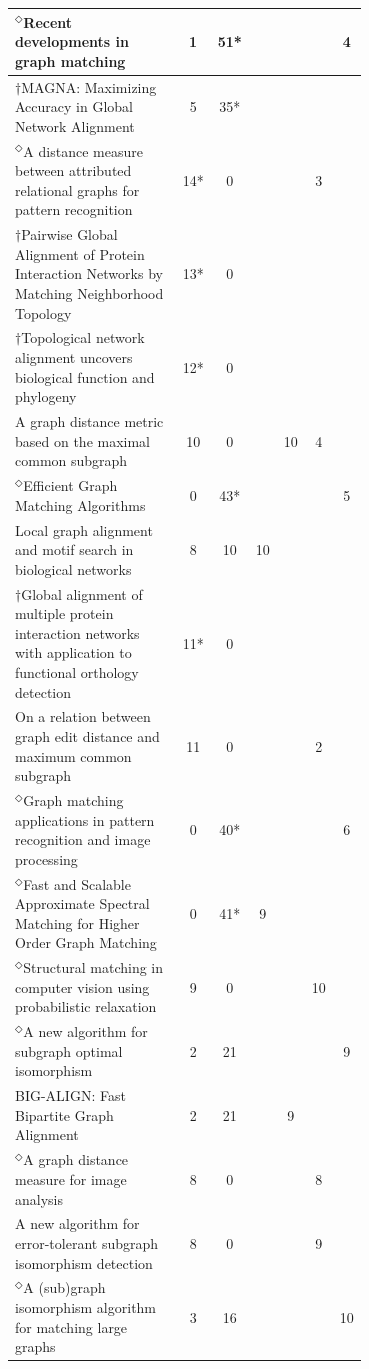 \documentclass[12pt]{thesis}
\theoremstyle{plain}
\theoremstyle{definition}
\theoremstyle{remark}
\begin{document}
\begin{table}[H]
{\begin{tabular}{|L{0.7\linewidth}|c|c|c|c|c|c|}
$^\Diamond$Recent developments in graph matching  \cite{Bunke_2000} & 1 & 51* &  &  &  & 4 \\ \hline
$\dagger$MAGNA: Maximizing Accuracy in Global Network Alignment  \cite{Saraph_2014} & 5 & 35* &  &  &  &  \\ \hline
$^\Diamond$A distance measure between attributed relational graphs for pattern recognition  \cite{Sanfeliu_1983} & 14* & 0 &  &  & 3 &  \\ \hline
$\dagger$Pairwise Global Alignment of Protein Interaction Networks by Matching Neighborhood Topology  \cite{Singh_2007} & 13* & 0 &  &  &  &  \\ \hline
$\dagger$Topological network alignment uncovers biological function and phylogeny  \cite{Bunke_1998} & 12* & 0 &  &  &  &  \\ \hline
A graph distance metric based on the maximal common subgraph  \cite{Kuchaiev_2010} & 10 & 0 &  & 10 & 4 &  \\ \hline
$^\Diamond$Efficient Graph Matching Algorithms  \cite{Messmer_1995} & 0 & 43* &  &  &  & 5 \\ \hline
Local graph alignment and motif search in biological networks  \cite{Berg_2004} & 8 & 10 & 10 &  &  &  \\ \hline
$\dagger$Global alignment of multiple protein interaction networks with application to functional orthology detection  \cite{Singh_2008} & 11* & 0 &  &  &  &  \\ \hline
On a relation between graph edit distance and maximum common subgraph  \cite{Bunke_1997} & 11 & 0 &  &  & 2 &  \\ \hline
$^\Diamond$Graph matching applications in pattern recognition and image processing  \cite{Conte_2003} & 0 & 40* &  &  &  & 6 \\ \hline
$^\Diamond$Fast and Scalable Approximate Spectral Matching for Higher Order Graph Matching  \cite{Park_2014} & 0 & 41* & 9 &  &  &  \\ \hline
$^\Diamond$Structural matching in computer vision using probabilistic relaxation  \cite{Christmas_1995} & 9 & 0 &  &  & 10 &  \\ \hline
$^\Diamond$A new algorithm for subgraph optimal isomorphism  \cite{El_Sonbaty_1998} & 2 & 21 &  &  &  & 9 \\ \hline
BIG-ALIGN: Fast Bipartite Graph Alignment  \cite{Koutra_2013} & 2 & 21 &  & 9 &  &  \\ \hline
$^\Diamond$A graph distance measure for image analysis  \cite{Eshera_1984} & 8 & 0 &  &  & 8 &  \\ \hline
A new algorithm for error-tolerant subgraph isomorphism detection  \cite{Messmer_1998} & 8 & 0 &  &  & 9 &  \\ \hline
$^\Diamond$A (sub)graph isomorphism algorithm for matching large graphs  \cite{Cordella_2004} & 3 & 16 &  &  &  & 10 \\ \hline
\end{tabular}

}
\end{table}
\end{document}
